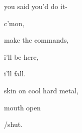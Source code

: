 \documentclass[extrafontsizes, 48pt]{memoir}
\newcommand\blankpage{%
    \null
    \thispagestyle{empty}%
    \addtocounter{page}{-1}%
    \newpage}
\begin{document}
	\begin{minipage}{.6\textwidth}
	you said you'd do it-
	\afterpage{\blankpage}
	\end{minipage}
	\newpage

	\begin{minipage}{.6\textwidth}
	c'mon,
	\end{minipage}
	\newpage

	\begin{minipage}{.6\textwidth}
	make the commands,
	\end{minipage}
	\newpage

	\begin{minipage}{.6\textwidth}
	i'll be here,
	\end{minipage}
	\newpage

	\begin{minipage}{.6\textwidth}
	i'll fall.
	\afterpage{\blankpage}
	\end{minipage}
	\newpage

	\begin{minipage}{.6\textwidth}
	skin on cool hard metal,
	\end{minipage}
	\newpage

	\begin{minipage}{.6\textwidth}
	mouth open
	\end{minipage}
	\newpage

	\begin{minipage}{.6\textwidth}
	/shut.
	\afterpage{\blankpage}
	\end{minipage}
	\newpage
\end{document}
